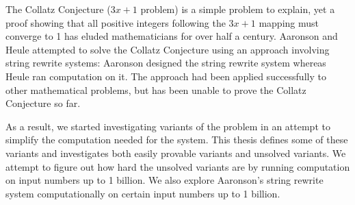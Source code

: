 \documentclass[12pt]{report}	%
\begin{document}
%
\utabstract
{}%
\indent
The Collatz Conjecture ($3x+1$ problem) is a simple problem to explain, yet a proof showing that all positive integers following the $3x+1$ mapping must converge to 1 has eluded mathematicians for over half a century. Aaronson and Heule attempted to solve the Collatz Conjecture using an approach involving string rewrite systems: Aaronson designed the string rewrite system whereas Heule ran computation on it. The approach had been applied successfully to other mathematical problems, but has been unable to prove the Collatz Conjecture so far.\par
As a result, we started investigating variants of the problem in an attempt to simplify the computation needed for the system. This thesis defines some of these variants and investigates both easily provable variants and unsolved variants. We attempt to figure out how hard the unsolved variants are by running computation on input numbers up to 1 billion. We also explore Aaronson's string rewrite system computationally on certain input numbers up to 1 billion.
\end{document}
